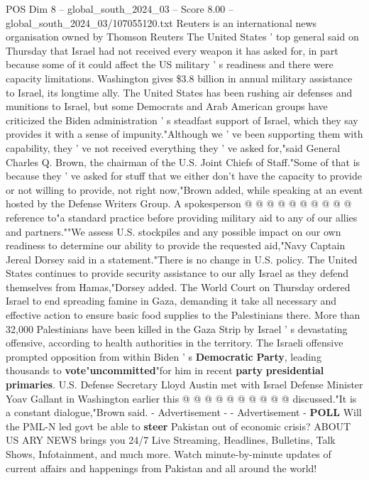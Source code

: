 \begin{textsample}{POS Dim 8 – global\_south\_2024\_03 – Score 8.00 – global\_south\_2024\_03/107055120.txt}  \label{ex:f8_pos_094}
Reuters is an international news organisation owned by Thomson Reuters The United States ' top general said on Thursday that Israel had not received every weapon it has asked for, in part because some of it could affect the US military ' s readiness and there were capacity limitations.
Washington gives \$3.8 billion in annual military assistance to Israel, its longtime ally.
The United States has been rushing air defenses and munitions to Israel, but some Democrats and Arab American groups have criticized the Biden administration ' s steadfast support of Israel, which they say provides it with a sense of impunity."Although we ' ve been supporting them with capability, they ' ve not received everything they ' ve asked for,"said General Charles Q.
Brown, the chairman of the U.S.
Joint Chiefs of Staff."Some of that is because they ' ve asked for stuff that we either don't have the capacity to provide or not willing to provide, not right now,"Brown added, while speaking at an event hosted by the Defense Writers Group.
A spokesperson @ @ @ @ @ @ @ @ @ @ reference to"a standard practice before providing military aid to any of our allies and partners.""We assess U.S. stockpiles and any possible impact on our own readiness to determine our ability to provide the requested aid,"Navy Captain Jereal Dorsey said in a statement."There is no change in U.S. policy.
The United States continues to provide security assistance to our ally Israel as they defend themselves from Hamas,"Dorsey added.
The World Court on Thursday ordered Israel to end spreading famine in Gaza, demanding it take all necessary and effective action to ensure basic food supplies to the Palestinians there.
More than 32,000 Palestinians have been killed in the Gaza Strip by Israel ' s devastating offensive, according to health authorities in the territory.
The Israeli offensive prompted opposition from within Biden ' s \textbf{Democratic} \textbf{Party}, leading thousands to \textbf{vote}"\textbf{uncommitted}"for him in recent \textbf{party} \textbf{presidential} \textbf{primaries}.
U.S.
Defense Secretary Lloyd Austin met with Israel Defense Minister Yoav Gallant in Washington earlier this @ @ @ @ @ @ @ @ @ @ discussed."It is a constant dialogue,"Brown said. - Advertisement - - Advertisement - \textbf{POLL} Will the PML-N led govt be able to \textbf{steer} Pakistan out of economic crisis?
ABOUT US ARY NEWS brings you 24/7 Live Streaming, Headlines, Bulletins, Talk Shows, Infotainment, and much more.
Watch minute-by-minute updates of current affairs and happenings from Pakistan and all around the world!

\end{textsample}
